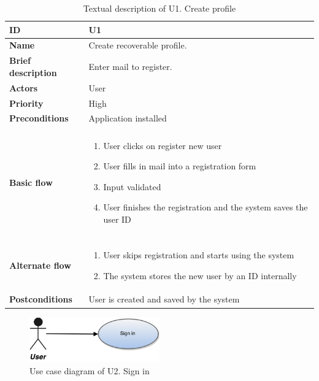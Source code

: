 \begin{table}[htp]
	\centering
	\caption{Textual description of U1. Create profile}
	\begin{tabular}[b]{|l | l|}\hline
		\textbf{ID} 				& U1									\\\hline
		\textbf{Name} 				& Create recoverable profile.			\\\hline
		\textbf{Brief description}	& Enter mail to register. 				\\\hline
		\textbf{Actors} 			& User									\\\hline
		\textbf{Priority}			& High									\\\hline
		\textbf{Preconditions}		& Application installed					\\\hline&\\[-2ex]
		\textbf{Basic flow}			& \begin{minipage}{5in}
									  \begin{enumerate}[noitemsep]
										\item User clicks on register new user
										\item User fills in mail into a registration form
										\item Input validated
										\item User finishes the registration and the system saves the user ID
									  \end{enumerate}						
									  \end{minipage}						\\\hline&\\[-2ex]
		\textbf{Alternate flow}		& \begin{minipage}{5in}
									  \begin{enumerate}[noitemsep]
										\item User skips registration and starts using the system
										\item The system stores the new user by an ID internally
									  \end{enumerate}
									 \end{minipage}							\\\hline
		\textbf{Postconditions}		& User is created and saved by the system\\\hline
	\end{tabular}
	\label{Tab:U1}
\end{table}

\begin{figure}[htp]
	\includegraphics[width=0.5\textwidth]{fig/U2}
	\centering
	\caption{Use case diagram of U2. Sign in}
	\label{Fig:U2}
\end{figure}

